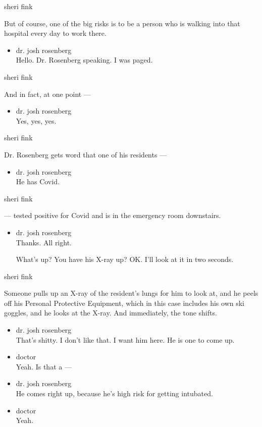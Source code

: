 sheri fink

But of course, one of the big risks is to be a person who is walking
into that hospital every day to work there.

\begin{itemize}
\tightlist
\item
  dr. josh rosenberg\\
  Hello. Dr. Rosenberg speaking. I was paged.
\end{itemize}

sheri fink

And in fact, at one point ---

\begin{itemize}
\tightlist
\item
  dr. josh rosenberg\\
  Yes, yes, yes.
\end{itemize}

sheri fink

Dr. Rosenberg gets word that one of his residents ---

\begin{itemize}
\tightlist
\item
  dr. josh rosenberg\\
  He has Covid.
\end{itemize}

sheri fink

--- tested positive for Covid and is in the emergency room downstairs.

\begin{itemize}
\item
  dr. josh rosenberg\\
  Thanks. All right.

  What's up? You have his X-ray up? OK. I'll look at it in two seconds.
\end{itemize}

sheri fink

Someone pulls up an X-ray of the resident's lungs for him to look at,
and he peels off his Personal Protective Equipment, which in this case
includes his own ski goggles, and he looks at the X-ray. And
immediately, the tone shifts.

\begin{itemize}
\item
  dr. josh rosenberg\\
  That's shitty. I don't like that. I want him here. He is one to come
  up.
\item
  doctor\\
  Yeah. Is that a ---
\item
  dr. josh rosenberg\\
  He comes right up, because he's high risk for getting intubated.
\item
  doctor\\
  Yeah.
\end{itemize}


